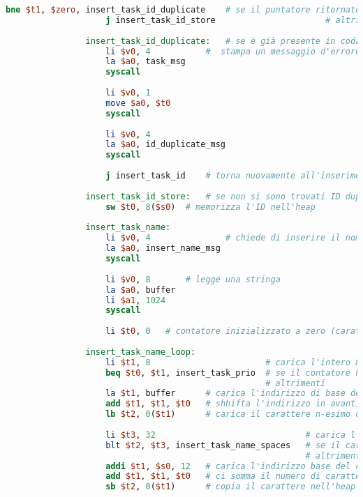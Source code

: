 \begin{center}
\begin{lstlisting}[language=mips, gobble=14, stepnumber=1]
                    bne $t1, $zero, insert_task_id_duplicate	# se il puntatore ritornato da find_id è non nullo, esiste già un task con l'ID inserito
                    j insert_task_id_store						# altrimenti, può memorizzare l'ID tranquillamente
                    
                insert_task_id_duplicate:	# se è già presente in coda un task con l'ID inserito
                    li $v0, 4			#  stampa un messaggio d'errore
                    la $a0, task_msg
                    syscall
                    
                    li $v0, 1
                    move $a0, $t0
                    syscall
                    
                    li $v0, 4
                    la $a0, id_duplicate_msg
                    syscall
                    
                    j insert_task_id	# torna nuovamente all'inserimento dell'ID
                    
                insert_task_id_store:	# se non si sono trovati ID duplicati
                    sw $t0, 8($s0)	# memorizza l'ID nell'heap
                    
                insert_task_name:
                    li $v0, 4				# chiede di inserire il nome del task
                    la $a0, insert_name_msg
                    syscall
                    
                    li $v0, 8		# legge una stringa
                    la $a0, buffer
                    li $a1, 1024
                    syscall
                    
                    li $t0, 0	# contatore inizializzato a zero (caratteri copiati nell'heap)
                    
                insert_task_name_loop:
                    li $t1, 8						# carica l'intero 8
                    beq $t0, $t1, insert_task_prio	# se il contatore ha raggiunto 8, salta all'inserimento della priorità
                									# altrimenti
                    la $t1, buffer		# carica l'indirizzo di base della stringa inserita
                    add $t1, $t1, $t0	# shhifta l'indirizzo in avanti del numero di caratteri già copiati (diciamo n)
                    lb $t2, 0($t1)		# carica il carattere n-esimo della stringa
                	
                    li $t3, 32								# carica l'intero 32 (primo carattere non speciale nella codifica ASCII)
                    blt $t2, $t3, insert_task_name_spaces	# se il carattere letto è un carattere speciale, inizia il loop per inserire spazi
                											# altrimenti	
                    addi $t1, $s0, 12	# carica l'indirizzo base del campo nome del task (indirizzo base del record + 12 byte)
                    add $t1, $t1, $t0	# ci somma il numero di caratteri letti (prima posizione del nome non copiata)
                    sb $t2, 0($t1)		# copia il carattere nell'heap
                	

\end{lstlisting}
\end{center}
